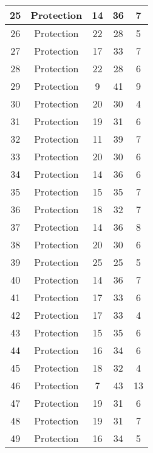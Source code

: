 \documentclass[results.tex]{subfiles}
\begin{document}
\begin{center}
\begin{tabular}{| c || c | c | c | c |}
    \hline
    25 & Protection & 14 & 36 & 7 \\ 
    \hline
    26 & Protection & 22 & 28 & 5 \\ 
    \hline
    27 & Protection & 17 & 33 & 7 \\ 
    \hline
    28 & Protection & 22 & 28 & 6 \\ 
    \hline
    29 & Protection & 9 & 41 & 9 \\ 
    \hline
    30 & Protection & 20 & 30 & 4 \\ 
    \hline
    31 & Protection & 19 & 31 & 6 \\ 
    \hline
    32 & Protection & 11 & 39 & 7 \\ 
    \hline
    33 & Protection & 20 & 30 & 6 \\ 
    \hline
    34 & Protection & 14 & 36 & 6 \\ 
    \hline
    35 & Protection & 15 & 35 & 7 \\ 
    \hline
    36 & Protection & 18 & 32 & 7 \\ 
    \hline
    37 & Protection & 14 & 36 & 8 \\ 
    \hline
    38 & Protection & 20 & 30 & 6 \\ 
    \hline
    39 & Protection & 25 & 25 & 5 \\ 
    \hline
    40 & Protection & 14 & 36 & 7 \\ 
    \hline
    41 & Protection & 17 & 33 & 6 \\ 
    \hline
    42 & Protection & 17 & 33 & 4 \\ 
    \hline
    43 & Protection & 15 & 35 & 6 \\ 
    \hline
    44 & Protection & 16 & 34 & 6 \\ 
    \hline
    45 & Protection & 18 & 32 & 4 \\ 
    \hline
    46 & Protection & 7 & 43 & 13 \\ 
    \hline
    47 & Protection & 19 & 31 & 6 \\ 
    \hline
    48 & Protection & 19 & 31 & 7 \\ 
    \hline
    49 & Protection & 16 & 34 & 5 \\ 
    \hline   \end{tabular}
\end{center}
\end{document}
